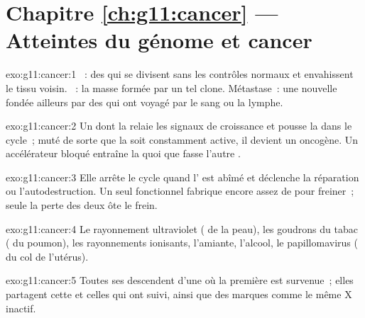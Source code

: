 \section*{Chapitre \ref{ch:g11:cancer} --- Atteintes du génome et cancer}

\begin{solution}{exo:g11:cancer:1}
~: des  qui se divisent sans les contrôles normaux et
envahissent le tissu voisin. ~: la masse formée par un tel clone.
Métastase~: une nouvelle  fondée ailleurs par des  qui
ont voyagé par le sang ou la lymphe.
\end{solution}

\begin{solution}{exo:g11:cancer:2}
Un  dont la  relaie les signaux de croissance et pousse la
 dans le cycle~; muté de sorte que la  soit constamment
active, il devient un oncogène. Un accélérateur bloqué entraîne la
 quoi que fasse l'autre .
\end{solution}

\begin{solution}{exo:g11:cancer:3}
Elle arrête le cycle quand l' est abîmé et déclenche la réparation
ou l'autodestruction. Un seul  fonctionnel fabrique encore assez
de  pour freiner~; seule la perte des deux ôte le frein.
\end{solution}

\begin{solution}{exo:g11:cancer:4}
Le rayonnement ultraviolet ( de la peau), les goudrons du tabac
( du poumon), les rayonnements ionisants, l'amiante, l'alcool, le
papillomavirus ( du col de l'utérus).
\end{solution}

\begin{solution}{exo:g11:cancer:5}
Toutes ses  descendent d'une  où la première 
est survenue~; elles partagent cette  et celles qui ont suivi,
ainsi que des marques comme le même  X inactif.
\end{solution}

